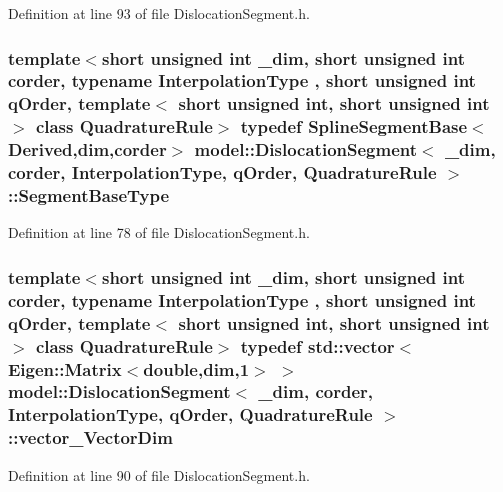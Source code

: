 Definition at line 93 of file Dislocation\+Segment.\+h.

\hypertarget{classmodel_1_1_dislocation_segment_a3159fd5418369676fcfb52cbc790ae35}{}
\subsubsection[{Segment\+Base\+Type}]{\setlength{\rightskip}{0pt plus 5cm}template$<$short unsigned int \+\_\+dim, short unsigned int corder, typename Interpolation\+Type , short unsigned int q\+Order, template$<$ short unsigned int, short unsigned int $>$ class Quadrature\+Rule$>$ typedef {\bf Spline\+Segment\+Base}$<${\bf Derived},{\bf dim},corder$>$ {\bf model\+::\+Dislocation\+Segment}$<$ \+\_\+dim, corder, Interpolation\+Type, q\+Order, Quadrature\+Rule $>$\+::{\bf Segment\+Base\+Type}}\label{classmodel_1_1_dislocation_segment_a3159fd5418369676fcfb52cbc790ae35}


Definition at line 78 of file Dislocation\+Segment.\+h.

\hypertarget{classmodel_1_1_dislocation_segment_abc79dbe2a844d424d597677d88324502}{}
\subsubsection[{vector\+\_\+\+Vector\+Dim}]{\setlength{\rightskip}{0pt plus 5cm}template$<$short unsigned int \+\_\+dim, short unsigned int corder, typename Interpolation\+Type , short unsigned int q\+Order, template$<$ short unsigned int, short unsigned int $>$ class Quadrature\+Rule$>$ typedef std\+::vector$<$Eigen\+::\+Matrix$<$double,{\bf dim},1$>$ $>$ {\bf model\+::\+Dislocation\+Segment}$<$ \+\_\+dim, corder, Interpolation\+Type, q\+Order, Quadrature\+Rule $>$\+::{\bf vector\+\_\+\+Vector\+Dim}}\label{classmodel_1_1_dislocation_segment_abc79dbe2a844d424d597677d88324502}


Definition at line 90 of file Dislocation\+Segment.\+h.

\hypertarget{classmodel_1_1_dislocation_segment_a281818c12d5407c323c68433ed958587}{}

